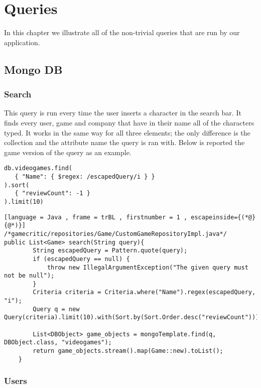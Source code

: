 \chapter{Queries}
In this chapter we illustrate all of the non-trivial queries that are run by our application.
\section{Mongo DB}
\subsection{Search}
This query is run every time the user inserts a character in the search bar. It finds every user, game and company that have in their name all of the characters typed. It works in the same way for all three elements; the only difference is the collection and the attribute name the query is ran with. Below is reported the game version of the query as an example.
\begin{Verbatim}[fontsize=\footnotesize]
db.videogames.find(
   { "Name": { $regex: /escapedQuery/i } }
).sort(
   { "reviewCount": -1 }
).limit(10)
\end{Verbatim}
\begin{lstlisting}[language = Java , frame = trBL , firstnumber = 1 , escapeinside={(*@}{@*)}]
/*gamecritic/repositories/Game/CustomGameRepositoryImpl.java*/
public List<Game> search(String query){
        String escapedQuery = Pattern.quote(query);
        if (escapedQuery == null) {
            throw new IllegalArgumentException("The given query must not be null");
        }
        Criteria criteria = Criteria.where("Name").regex(escapedQuery, "i");
        Query q = new Query(criteria).limit(10).with(Sort.by(Sort.Order.desc("reviewCount")));

        List<DBObject> game_objects = mongoTemplate.find(q, DBObject.class, "videogames");
        return game_objects.stream().map(Game::new).toList();
    }
\end{lstlisting}
\subsection{Users}
